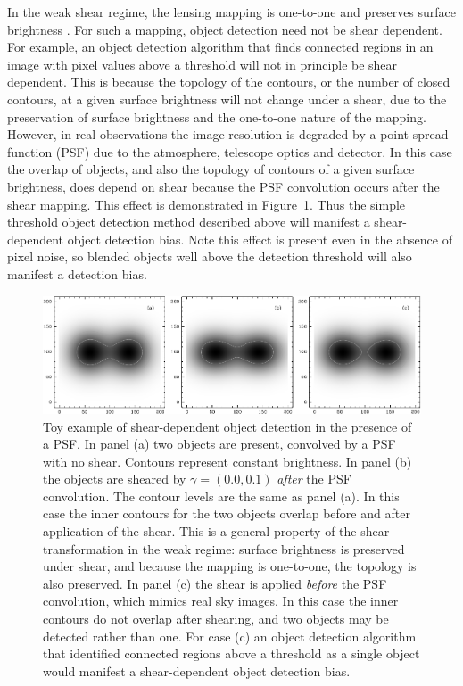 \documentclass[iop, twocolappendix, appendixfloats, numberedappendix, apj]{hackemulateapj}
\begin{document}
In the weak shear regime, the lensing mapping is one-to-one and preserves
surface brightness \citep{SchneiderBook92}. For such a mapping, object
detection need not be shear dependent. For example, an object detection
algorithm that finds connected regions in an image with pixel values above a
threshold will not in principle be shear dependent.  This is because the
topology of the contours, or the number of closed contours, at a given surface
brightness will not change under a shear, due to the preservation of surface
brightness and the one-to-one nature of the mapping.  However, in real
observations the image resolution is degraded by a point-spread-function (PSF)
due to the atmosphere, telescope optics and detector. In this case the overlap
of objects, and also the topology of contours of a given surface brightness,
does depend on shear because the PSF convolution occurs after the shear
mapping.  This effect is demonstrated in Figure~\ref{fig:toy}.  Thus the simple
threshold object detection method described above will manifest a
shear-dependent object detection bias.  Note this effect is present even in the
absence of pixel noise, so blended objects well above the detection threshold
will also manifest a detection bias.

\begin{figure}
    \begin{center}
        \includegraphics[width=\textwidth]{toy.pdf}

        \caption{ Toy example of shear-dependent object detection in the presence of
        a PSF.  In panel (a) two objects are present, convolved by a PSF with no
        shear.  Contours represent constant brightness.  In panel (b) the objects
        are sheared by $\gamma = (0.0, 0.1)$ {\em after} the PSF convolution.  The
        contour levels are the same as panel (a).  In this case the inner contours
        for the two objects overlap before and after application of the shear. This
        is a general property of the shear transformation in the weak regime:
        surface brightness is preserved under shear, and because the mapping is
        one-to-one, the topology is also preserved. In panel (c) the shear is
        applied {\em before} the PSF convolution, which mimics real sky images. In
        this case the inner contours do not overlap after shearing, and two objects
        may be detected rather than one.  For case (c) an object detection
        algorithm that identified connected regions above a threshold as a single
        object would manifest a shear-dependent object detection bias.
        \label{fig:toy} }
    \end{center}

\end{figure}
\end{document}
